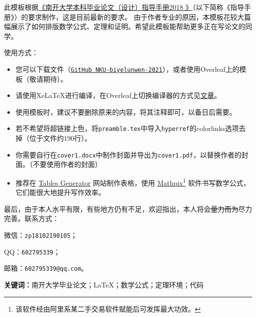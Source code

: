 \documentclass[zihao = -4, linespread = 1.5]{ctexart} %
\begin{document}
%

%
%
%
\begin{zhAbstract}
此模板根据\href{http://jwc.nankai.edu.cn/bylwwsjw/list.htm}{《南开大学本科毕业论文（设计）指导手册2018 》}（以下简称《指导手册》）的要求制作，这是目前最新的要求。
由于作者专业的原因，本模板花较大篇幅展示了如何排版数学公式、定理和证明。希望此模板能帮助更多正在写论文的同学。

使用方式：
\begin{itemize}
  \item 您可以下载文件（\href{https://github.com/skyline77/NKU-biyelunwen-2021}{\texttt{GitHub NKU-biyelunwen-2021}}），或者使用Overleaf上的模板（敬请期待）。
  \item 请使用XeLaTeX进行编译，在Overleaf上切换编译器的方式见\href{https://www.overleaf.com/learn/how-to/Changing_compiler}{文章}。
  \item 使用模板时，建议不要删除原来的内容，将其注释即可，以备日后需要。
  \item 若不希望将超链接上色，将\texttt{preamble.tex}中导入\texttt{hyperref}的colorlinks选项去掉（位于文件约190行）。
  \item 你需要自行在\texttt{cover1.docx}中制作封面并导出为\texttt{cover1.pdf}，以替换作者的封面。（不要使用作者的封面\blacksmiley{}）
  \item 推荐在 \href{https://www.tablesgenerator.com/}{Tables Generator} 网站制作表格，使用 \href{https://mathpix.com/ocr/}{Mathpix}\footnote{该软件经由阿里系某二手交易软件赋能后可发挥最大功效。} 软件书写数学公式，它们能很大地提升写作效率。
\end{itemize}

最后，由于本人水平有限，有些地方仍有不足，欢迎指出，本人将会\sout{量力而为}尽力完善。联系方式：
\begin{enumerate*}[label=(\arabic*)]
   \item 微信：\texttt{zp18102190105}；
  \item QQ：\texttt{602795339}；
  \item 邮箱：\texttt{602795339@qq.com}。
\end{enumerate*}
\par\noindent\textbf{关键词：}南开大学毕业论文；\LaTeX；数学公式；定理环境；代码
\end{zhAbstract}
\end{document}
